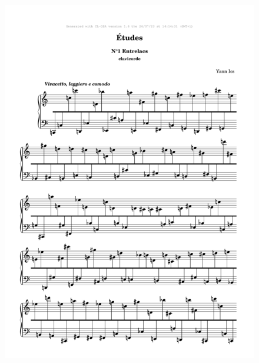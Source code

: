 \chapter*{}


\label{clav}

\vspace{1cm}

 \begin{figure}[H]
\begin{center}
\includegraphics[width=\textwidth]{mp/img/a-0.png}
\end{center}
\end{figure}


